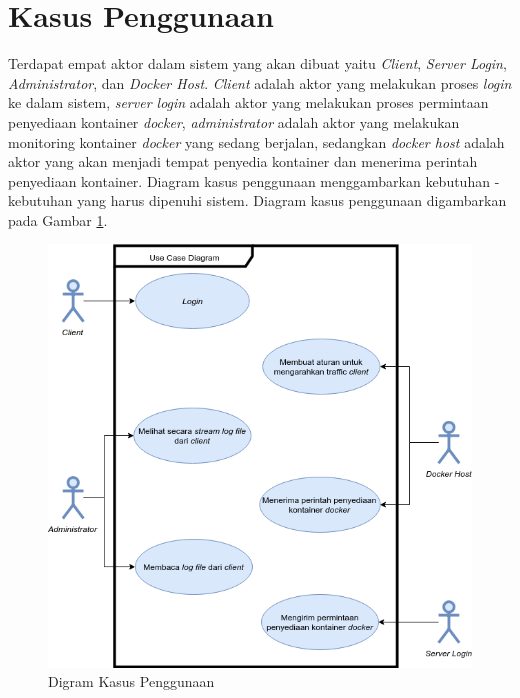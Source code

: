  \section{Kasus Penggunaan}
  Terdapat empat aktor dalam sistem yang akan dibuat yaitu \textit{Client}, \textit{Server Login}, \textit{Administrator}, dan \textit{Docker Host}. \textit{Client} adalah aktor yang melakukan proses \textit{login} ke dalam sistem, \textit{server login} adalah aktor yang melakukan proses permintaan penyediaan kontainer \textit{docker}, \textit{administrator} adalah aktor yang melakukan monitoring kontainer \textit{docker} yang sedang berjalan, sedangkan \textit{docker host} adalah aktor yang akan menjadi tempat penyedia kontainer dan menerima perintah penyediaan kontainer. Diagram kasus penggunaan menggambarkan kebutuhan - kebutuhan yang harus dipenuhi sistem. Diagram kasus penggunaan digambarkan pada Gambar \ref{gambarDiagramKasusPenggunaan}.
  \begin{figure}[!h] %
  \centering
  \includegraphics[width=\linewidth]{images/bab3/usecase}
  \caption{Digram Kasus Penggunaan}
  \label{gambarDiagramKasusPenggunaan}
  \end{figure}
  \\
		    		    
